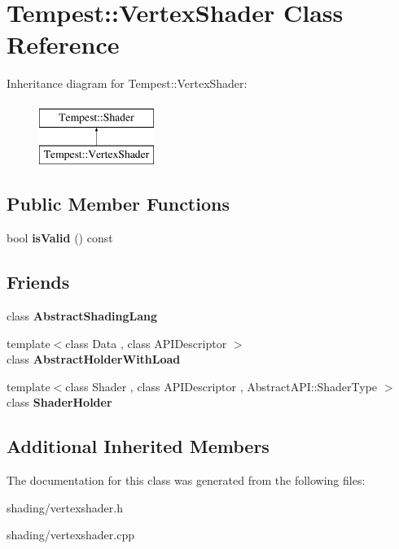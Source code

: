 \hypertarget{class_tempest_1_1_vertex_shader}{\section{Tempest\+:\+:Vertex\+Shader Class Reference}
\label{class_tempest_1_1_vertex_shader}
}
Inheritance diagram for Tempest\+:\+:Vertex\+Shader\+:\begin{figure}[H]
\begin{center}
\leavevmode
\includegraphics[height=2.000000cm]{class_tempest_1_1_vertex_shader}
\end{center}
\end{figure}
\subsection*{Public Member Functions}
\begin{DoxyCompactItemize}
\item 
\hypertarget{class_tempest_1_1_vertex_shader_a3e96b47f871af14f3a99d731a8d7fdc1}{bool {\bfseries is\+Valid} () const }\label{class_tempest_1_1_vertex_shader_a3e96b47f871af14f3a99d731a8d7fdc1}

\end{DoxyCompactItemize}
\subsection*{Friends}
\begin{DoxyCompactItemize}
\item 
\hypertarget{class_tempest_1_1_vertex_shader_aae7a40a130def4c19f2b818dc9c51de2}{class {\bfseries Abstract\+Shading\+Lang}}\label{class_tempest_1_1_vertex_shader_aae7a40a130def4c19f2b818dc9c51de2}

\item 
\hypertarget{class_tempest_1_1_vertex_shader_ad2e2e5798093053ccfa5c8bebc2e621f}{{\footnotesize template$<$class Data , class A\+P\+I\+Descriptor $>$ }\\class {\bfseries Abstract\+Holder\+With\+Load}}\label{class_tempest_1_1_vertex_shader_ad2e2e5798093053ccfa5c8bebc2e621f}

\item 
\hypertarget{class_tempest_1_1_vertex_shader_a9478041b9d4218bb2c32ad6faa058c73}{{\footnotesize template$<$class Shader , class A\+P\+I\+Descriptor , Abstract\+A\+P\+I\+::\+Shader\+Type $>$ }\\class {\bfseries Shader\+Holder}}\label{class_tempest_1_1_vertex_shader_a9478041b9d4218bb2c32ad6faa058c73}

\end{DoxyCompactItemize}
\subsection*{Additional Inherited Members}


The documentation for this class was generated from the following files\+:\begin{DoxyCompactItemize}
\item 
shading/vertexshader.\+h\item 
shading/vertexshader.\+cpp\end{DoxyCompactItemize}
